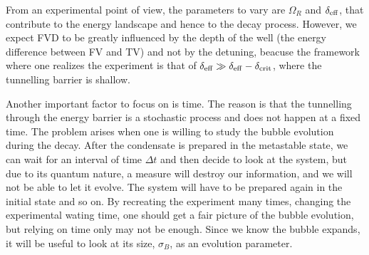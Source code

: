 From an experimental point of view, the parameters to vary are $\Omega_R$ and $\delta_{\rm eff}$, that contribute to the energy landscape and hence to the decay process. However, we expect FVD to be greatly influenced by the depth of the well (the energy difference between FV and TV) and not by the detuning, beacuse the framework where one realizes the experiment is that of $\delta_{\rm eff} \gg \delta_{\rm eff}-\delta_{\rm crit}$, where the tunnelling barrier is shallow.

Another important factor to focus on is time. The reason is that the tunnelling through the energy barrier is a stochastic process and does not happen at a fixed time. The problem arises when one is willing to study the bubble evolution during the decay. After the condensate is prepared in the metastable state, we can wait for an interval of time $\Delta t$ and then decide to look at the system, but due to its quantum nature, a measure will destroy our information, and we will not be able to let it evolve. The system will have to be prepared again in the initial state and so on. By recreating the experiment many times, changing the experimental wating time, one should get a fair picture of the bubble evolution, but relying on time only may not be enough. Since we know the bubble expands, it will be useful to look at its size, $\sigma_B$, as an evolution parameter.




